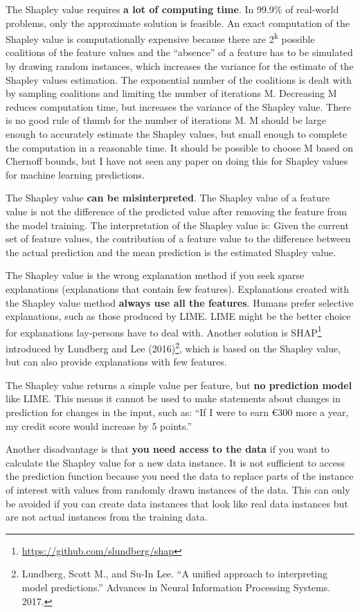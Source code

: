 \documentclass[
  12pt,
]{krantz}
\renewcommand{\href}[2]{#2\footnote{\url{#1}}}
\begin{document}
The Shapley value requires \textbf{a lot of computing time}.
In 99.9\% of real-world problems, only the approximate solution is feasible.
An exact computation of the Shapley value is computationally expensive because there are 2\textsuperscript{k} possible coalitions of the feature values and the ``absence'' of a feature has to be simulated by drawing random instances, which increases the variance for the estimate of the Shapley values estimation.
The exponential number of the coalitions is dealt with by sampling coalitions and limiting the number of iterations M.
Decreasing M reduces computation time, but increases the variance of the Shapley value.
There is no good rule of thumb for the number of iterations M.
M should be large enough to accurately estimate the Shapley values, but small enough to complete the computation in a reasonable time.
It should be possible to choose M based on Chernoff bounds, but I have not seen any paper on doing this for Shapley values for machine learning predictions.

The Shapley value \textbf{can be misinterpreted}.
The Shapley value of a feature value is not the difference of the predicted value after removing the feature from the model training.
The interpretation of the Shapley value is:
Given the current set of feature values, the contribution of a feature value to the difference between the actual prediction and the mean prediction is the estimated Shapley value.

The Shapley value is the wrong explanation method if you seek sparse explanations (explanations that contain few features).
Explanations created with the Shapley value method \textbf{always use all the features}.
Humans prefer selective explanations, such as those produced by LIME.
LIME might be the better choice for explanations lay-persons have to deal with.
Another solution is \href{https://github.com/slundberg/shap}{SHAP} introduced by Lundberg and Lee (2016)\footnote{Lundberg, Scott M., and Su-In Lee. ``A unified approach to interpreting model predictions.'' Advances in Neural Information Processing Systems. 2017.}, which is based on the Shapley value, but can also provide explanations with few features.

The Shapley value returns a simple value per feature, but \textbf{no prediction model} like LIME.
This means it cannot be used to make statements about changes in prediction for changes in the input, such as:
``If I were to earn €300 more a year, my credit score would increase by 5 points.''

Another disadvantage is that \textbf{you need access to the data} if you want to calculate the Shapley value for a new data instance.
It is not sufficient to access the prediction function because you need the data to replace parts of the instance of interest with values from randomly drawn instances of the data.
This can only be avoided if you can create data instances that look like real data instances but are not actual instances from the training data.
\end{document}
